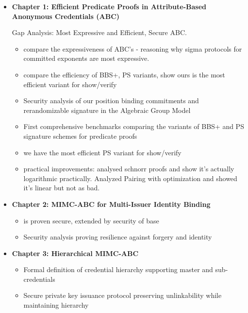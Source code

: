 \begin{itemize}
    \item \textbf{Chapter 1: Efficient Predicate Proofs in Attribute-Based Anonymous Credentials (ABC)}
    
    Gap Analysis: Most Expressive and Efficient, Secure ABC. 
    
    
    \begin{itemize}
        \item compare the expressiveness of ABC's - reasoning why sigma protocols for committed exponents are most expressive. 
        
        \item compare the efficiency of BBS+, PS variants, show ours is the most efficient variant for show/verify
    
        \item Security analysis of our position binding commitments and rerandomizable signature in the Algebraic Group Model
        
        \item First comprehensive benchmarks comparing the variants of BBS+ and PS signature schemes for predicate proofs

        \item we have the most efficient PS variant for show/verify
        
        \item practical improvements: analysed schnorr proofs and show it's actually logarithmic practically. Analyzed Pairing with optimization and showed it's linear but not as bad.
        
    \end{itemize}

    \item \textbf{Chapter 2: MIMC-ABC for Multi-Issuer Identity Binding}
    \begin{itemize}
        \item is proven secure, extended by security of base
        \item Security analysis proving resilience against forgery and identity
    \end{itemize}

    \item \textbf{Chapter 3: Hierarchical MIMC-ABC}
    \begin{itemize}
        \item Formal definition of credential hierarchy supporting master and sub-credentials
        \item Secure private key issuance protocol preserving unlinkability while maintaining hierarchy
    \end{itemize}


\end{itemize}
